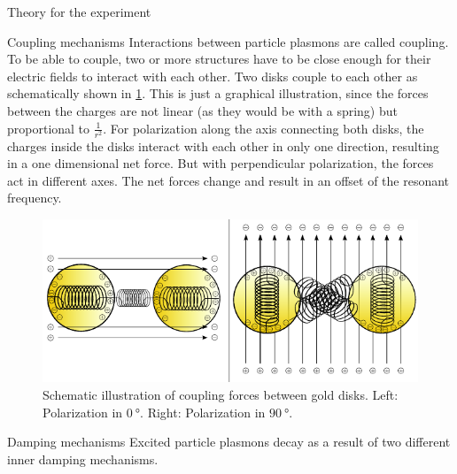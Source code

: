 \documentclass[pdftex, a4paper,11pt, twoside, UKenglish]{report}
\begin{document}
\begin{chapter}{Theory for the experiment}
    
    
    \begin{section}{Coupling mechanisms}
      \label{chp:TheoryCoupling}
      Interactions between particle plasmons are called coupling.
      To be able to couple, two or more structures have to be close enough for
      their electric fields to interact with each other. 
      Two disks couple to each other as schematically shown in
      \cref{fig:Coupling}. This is just a graphical illustration, since
      the forces between the charges are not linear (as they would be with a
      spring) but proportional to $\frac{1}{r^{2}}$. For polarization along the
      axis connecting both disks, the charges inside the disks interact with
      each other in only one direction, resulting in a one dimensional net
      force. But with perpendicular polarization, the forces act in different
      axes. The net forces change and result in an offset of the resonant
      frequency. 
      \begin{figure}[htbp]
        \centering
        \includegraphics[width=\textwidth]{Figures/Coupling.png}
        \caption{Schematic illustration of coupling forces between gold disks. 
            Left: Polarization in $\SI{0}{\degree}$. 
            Right: Polarization in $\SI{90}{\degree}$. }
        \label{fig:Coupling}
      \end{figure}
      
    \end{section}
    
    
    
    \begin{section}{Damping mechanisms}
      \label{chp:TheoryDamping}
      Excited particle plasmons decay as a result of two different inner
      damping mechanisms. 
      

\end{section}
\end{chapter}
\end{document}
